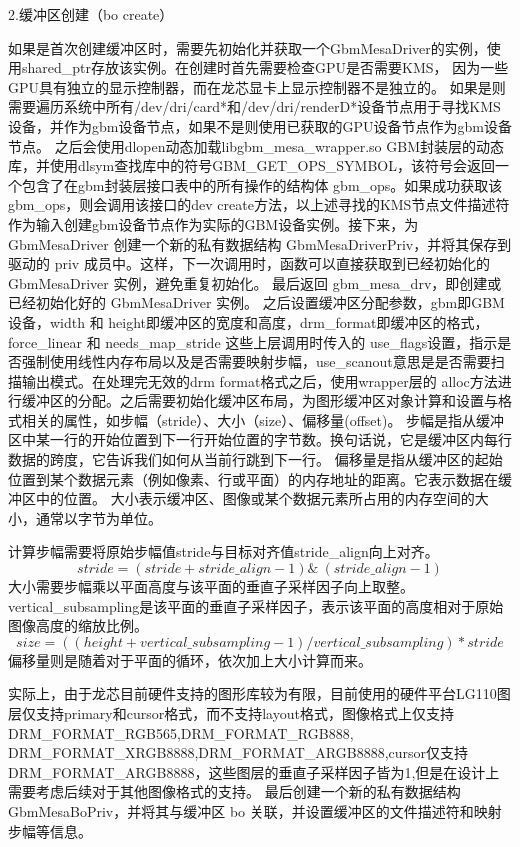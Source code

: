 2.缓冲区创建（bo create）

如果是首次创建缓冲区时，需要先初始化并获取一个GbmMesaDriver的实例，使用shared\_ptr存放该实例。在创建时首先需要检查GPU是否需要KMS，
因为一些GPU具有独立的显示控制器，而在龙芯显卡上显示控制器不是独立的。
如果是则需要遍历系统中所有/dev/dri/card*和/dev/dri/renderD*设备节点用于寻找KMS设备，并作为gbm设备节点，如果不是则使用已获取的GPU设备节点作为gbm设备节点。
之后会使用dlopen动态加载libgbm\_mesa\_wrapper.so GBM封装层的动态库，并使用dlsym查找库中的符号GBM\_GET\_OPS\_SYMBOL，该符号会返回一个包含了在gbm封装层接口表中的所有操作的结构体
gbm\_ops。如果成功获取该gbm\_ops，则会调用该接口的dev create方法，以上述寻找的KMS节点文件描述符作为输入创建gbm设备节点作为实际的GBM设备实例。接下来，为 GbmMesaDriver 
创建一个新的私有数据结构 GbmMesaDriverPriv，并将其保存到驱动的 priv 成员中。这样，下一次调用时，函数可以直接获取到已经初始化的 GbmMesaDriver 实例，避免重复初始化。
最后返回 gbm\_mesa\_drv，即创建或已经初始化好的 GbmMesaDriver 实例。
之后设置缓冲区分配参数，gbm即GBM设备，width 和 height即缓冲区的宽度和高度，drm\_format即缓冲区的格式，force\_linear 和 needs\_map\_stride
这些上层调用时传入的 use\_flags设置，指示是否强制使用线性内存布局以及是否需要映射步幅，use\_scanout意思是是否需要扫描输出模式。在处理完无效的drm format格式之后，使用wrapper层的
alloc方法进行缓冲区的分配。之后需要初始化缓冲区布局，为图形缓冲区对象计算和设置与格式相关的属性，如步幅（stride）、大小（size）、偏移量(offset)。
步幅是指从缓冲区中某一行的开始位置到下一行开始位置的字节数。换句话说，它是缓冲区内每行数据的跨度，它告诉我们如何从当前行跳到下一行。
偏移量是指从缓冲区的起始位置到某个数据元素（例如像素、行或平面）的内存地址的距离。它表示数据在缓冲区中的位置。
大小表示缓冲区、图像或某个数据元素所占用的内存空间的大小，通常以字节为单位。

计算步幅需要将原始步幅值stride与目标对齐值stride\_align向上对齐。
\begin{equation}
  stride=(stride+stride\_align-1)\&~(stride\_align-1)
\end{equation}
大小需要步幅乘以平面高度与该平面的垂直子采样因子向上取整。vertical\_subsampling是该平面的垂直子采样因子，表示该平面的高度相对于原始图像高度的缩放比例。
\begin{equation}
  size=((height+vertical\_subsampling-1)/vertical\_subsampling)*stride
\end{equation}
偏移量则是随着对于平面的循环，依次加上大小计算而来。

实际上，由于龙芯目前硬件支持的图形库较为有限，目前使用的硬件平台LG110图层仅支持primary和cursor格式，而不支持layout格式，图像格式上仅支持DRM\_FORMAT\_RGB565,DRM\_FORMAT\_RGB888,
DRM\_FORMAT\_XRGB8888,DRM\_FORMAT\_ARGB8888,cursor仅支持DRM\_FORMAT\_ARGB8888，这些图层的垂直子采样因子皆为1,但是在设计上需要考虑后续对于其他图像格式的支持。
最后创建一个新的私有数据结构 GbmMesaBoPriv，并将其与缓冲区 bo 关联，并设置缓冲区的文件描述符和映射步幅等信息。

